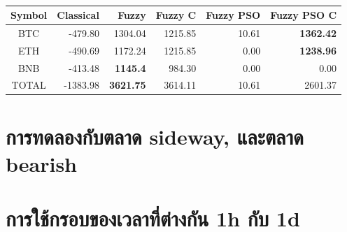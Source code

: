 \begin{table}[]
    \centering
    \begin{tabular}{crrrrr}
        \hline
        \textbf{Symbol} & \textbf{Classical} & \textbf{Fuzzy}                          & \textbf{Fuzzy C} & \textbf{Fuzzy PSO}          & \textbf{Fuzzy PSO C}                    \\ \hline
        BTC             & -479.80            & {\color[HTML]{000000} 1304.04}          & 1215.85          & 10.61                       & {\color[HTML]{009901} \textbf{1362.42}} \\ \hline
        ETH             & -490.69            & 1172.24                                 & 1215.85          & {\color[HTML]{000000} 0.00} & {\color[HTML]{009901} \textbf{1238.96}} \\ \hline
        BNB             & -413.48            & {\color[HTML]{009901} \textbf{1145.4}}  & 984.30           & 0.00                        & 0.00                                    \\ \hline
        TOTAL           & -1383.98           & {\color[HTML]{009901} \textbf{3621.75}} & 3614.11          & 10.61                       & {\color[HTML]{000000} 2601.37}          \\ \hline
    \end{tabular}
    \caption{}
    \label{tab:rsi-bb-crypto}
\end{table}

\section{การทดลองกับตลาด sideway, และตลาด bearish}

\section{การใช้กรอบของเวลาที่ต่างกัน 1h กับ 1d}